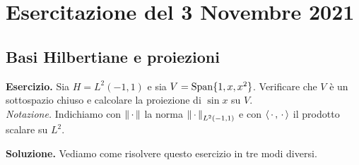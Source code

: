 %
%

\section{Esercitazione del 3 Novembre 2021}

\subsection{Basi Hilbertiane e proiezioni}

\textbf{Esercizio.}
Sia $H = L^2(-1, 1)$ e sia $V = \operatorname{Span}\{ 1, x, x^2 \}$. Verificare che $V$ è un sottospazio chiuso e calcolare la proiezione di $\sin x$ su $V$. \\
\textit{Notazione.} Indichiamo con $\left\lVert \,\cdot\, \right\rVert$ la norma $\left\lVert \,\cdot\, \right\rVert_{L^2(-1, 1)}$ e con $\langle \,\cdot\,, \,\cdot\, \rangle$ il prodotto scalare su $L^2$.

\textbf{Soluzione.}
Vediamo come risolvere questo esercizio in tre modi diversi.

